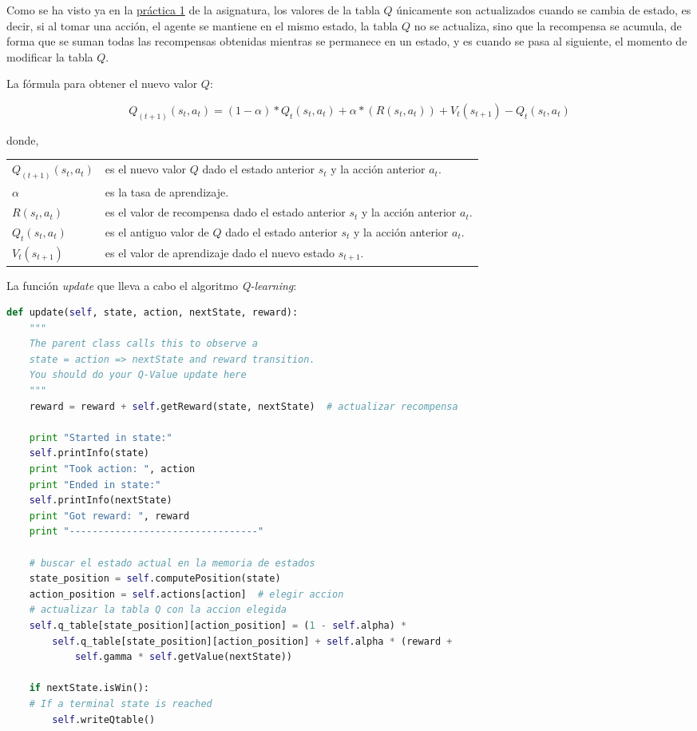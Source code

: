 \documentclass[11pt]{exam}
\makeatletter
\newenvironment{conditions}
{\par\vspace{\abovedisplayskip}\noindent\begin{tabular}{>{$}l<{$} @{${}\:{}$} l}}
	{\end{tabular}\par\vspace{\belowdisplayskip}}
\makeatother
\begin{document}
Como se ha visto ya en la \href{https://poliformat.upv.es/portal/site/ESP_0_2835/tool/c07b745a-0cfd-44f0-a7a2-9bb22f80c3f7?panel=Main}{práctica 1} de la asignatura, los valores de la tabla $Q$ únicamente son actualizados cuando se cambia de estado, es decir, si al tomar una acción, el agente se mantiene en el mismo estado, la tabla $Q$ no se actualiza, sino que la recompensa se acumula, de forma que se suman todas las recompensas obtenidas mientras se permanece en un estado, y es cuando se pasa al siguiente, el momento de modificar la tabla $Q$. 

\newpage

La fórmula para obtener el nuevo valor $Q$:

\begin{equation}\label{formula}
	Q_{(t+1)}(s_{t},a_{t}) = (1-\alpha) * Q_{t}(s_{t},a_{t}) + \alpha * (R(s_{t},a_{t})) + V_{t}(s_{t+1}) - Q_{t}(s_{t},a_{t})
\end{equation}

donde,

\begin{conditions}
	Q_{(t+1)}(s_{t},a_{t}) & es el nuevo valor $Q$ dado el estado anterior $s_{t}$ y la acción anterior $a_{t}$. \\
	\alpha & es la tasa de aprendizaje. \\
	R(s_{t},a_{t}) & es el valor de recompensa dado el estado anterior $s_{t}$ y la acción anterior $a_{t}$.	\\
	Q_{t}(s_{t},a_{t}) & es el antiguo valor de $Q$ dado el estado anterior $s_{t}$ y la acción anterior $a_{t}$.	\\
	V_{t}(s_{t+1}) & es el valor de aprendizaje dado el nuevo estado $s_{t+1}$.
\end{conditions}

La función \textit{update} que lleva a cabo el algoritmo \textit{Q-learning}:
\vspace*{3mm}

\begin{lstlisting}[caption={Función update.}, label={update}, language=python, basicstyle=\footnotesize]
def update(self, state, action, nextState, reward):
	"""
	The parent class calls this to observe a
	state = action => nextState and reward transition.
	You should do your Q-Value update here
	"""
	reward = reward + self.getReward(state, nextState)  # actualizar recompensa
	
	print "Started in state:"
	self.printInfo(state)
	print "Took action: ", action
	print "Ended in state:"
	self.printInfo(nextState)
	print "Got reward: ", reward
	print "---------------------------------"

	# buscar el estado actual en la memoria de estados
	state_position = self.computePosition(state)
	action_position = self.actions[action]  # elegir accion
	# actualizar la tabla Q con la accion elegida
	self.q_table[state_position][action_position] = (1 - self.alpha) * 
		self.q_table[state_position][action_position] + self.alpha * (reward + 
			self.gamma * self.getValue(nextState))

	if nextState.isWin():
	# If a terminal state is reached
		self.writeQtable()
\end{lstlisting}
\end{document}
